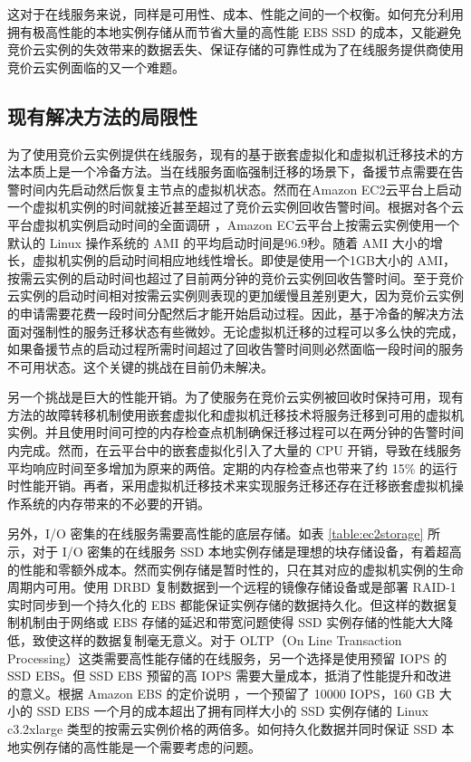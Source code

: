 这对于在线服务来说，同样是可用性、成本、性能之间的一个权衡。如何充分利用拥有极高性能的本地实例存储从而节省大量的高性能 EBS SSD 的成本，又能避免竞价云实例的失效带来的数据丢失、保证存储的可靠性成为了在线服务提供商使用竞价云实例面临的又一个难题。
\subsection{现有解决方法的局限性}
\label{sec:gemini_challenges}
为了使用竞价云实例提供在线服务，现有的基于嵌套虚拟化和虚拟机迁移技术的方法\cite{He:2015:CCH:2749246.2749275}本质上是一个冷备方法。当在线服务面临强制迁移的场景下，备援节点需要在告警时间内先启动然后恢复主节点的虚拟机状态。然而在Amazon EC2云平台上启动一个虚拟机实例的时间就接近甚至超过了竞价云实例回收告警时间。根据对各个云平台虚拟机实例启动时间的全面调研 \cite{Mao:2012:PSV:2353730.2353859}，Amazon EC云平台上按需云实例使用一个默认的 Linux 操作系统的 AMI 的平均启动时间是96.9秒。随着 AMI 大小的增长，虚拟机实例的启动时间相应地线性增长。即使是使用一个1GB大小的 AMI，按需云实例的启动时间也超过了目前两分钟的竞价云实例回收告警时间。至于竞价云实例的启动时间相对按需云实例则表现的更加缓慢且差别更大，因为竞价云实例的申请需要花费一段时间分配然后才能开始启动过程。因此，基于冷备的解决方法面对强制性的服务迁移状态有些微妙。无论虚拟机迁移的过程可以多么快的完成，如果备援节点的启动过程所需时间超过了回收告警时间则必然面临一段时间的服务不可用状态。这个关键的挑战在目前仍未解决。

另一个挑战是巨大的性能开销。为了使服务在竞价云实例被回收时保持可用，现有方法的故障转移机制使用嵌套虚拟化和虚拟机迁移技术将服务迁移到可用的虚拟机实例。并且使用时间可控的内存检查点机制确保迁移过程可以在两分钟的告警时间内完成。然而，在云平台中的嵌套虚拟化引入了大量的 CPU 开销，导致在线服务平均响应时间至多增加为原来的两倍。定期的内存检查点也带来了约 15\% 的运行时性能开销。再者，采用虚拟机迁移技术来实现服务迁移还存在迁移嵌套虚拟机操作系统的内存带来的不必要的开销。

另外，I/O 密集的在线服务需要高性能的底层存储。如表 \ref{table:ec2storage} 所示，对于 I/O 密集的在线服务 SSD 本地实例存储是理想的块存储设备，有着超高的性能和零额外成本。然而实例存储是暂时性的，只在其对应的虚拟机实例的生命周期内可用。使用 DRBD 复制数据到一个远程的镜像存储设备或是部署 RAID-1 实时同步到一个持久化的 EBS 都能保证实例存储的数据持久化。但这样的数据复制机制由于网络或 EBS 存储的延迟和带宽问题使得 SSD 实例存储的性能大大降低，致使这样的数据复制毫无意义。对于 OLTP（On Line Transaction Processing）这类需要高性能存储的在线服务，另一个选择是使用预留 IOPS 的 SSD EBS。但 SSD EBS 预留的高 IOPS 需要大量成本，抵消了性能提升和改进的意义。根据 Amazon EBS 的定价说明 \cite{EBSPricing:2015}，一个预留了 10000 IOPS，160 GB 大小的 SSD EBS 一个月的成本超出了拥有同样大小的 SSD 实例存储的 Linux c3.2xlarge 类型的按需云实例价格的两倍多。如何持久化数据并同时保证 SSD 本地实例存储的高性能是一个需要考虑的问题。

